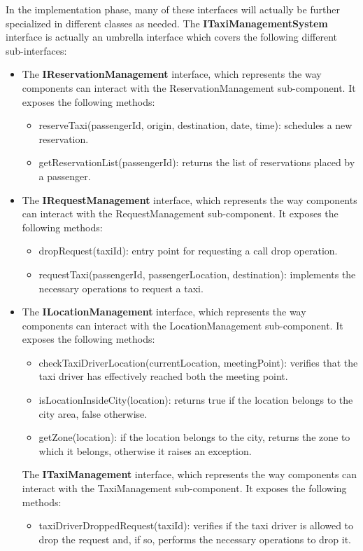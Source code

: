 In the implementation phase, many of these interfaces will actually be further specialized in different classes as needed.
The \textbf{ITaxiManagementSystem} interface is actually an umbrella interface which covers the following different sub-interfaces: 
	\begin{itemize}
	\item The \textbf{IReservationManagement} interface, which represents the way components can interact with the ReservationManagement sub-component. It exposes the following methods:
	\begin{itemize}
	\item reserveTaxi(passengerId, origin, destination, date, time): schedules a new reservation.
	\item getReservationList(passengerId): returns the list of reservations placed by a passenger.
	\end{itemize}
	\item The \textbf{IRequestManagement} interface, which represents the way components can interact with the RequestManagement sub-component. It exposes the following methods:
	\begin{itemize}
	\item dropRequest(taxiId): entry point for requesting a call drop operation.
	\item requestTaxi(passengerId, passengerLocation, destination): implements the necessary operations to request a taxi.
	\end{itemize}
	\item The \textbf{ILocationManagement} interface, which represents the way components can interact with the LocationManagement sub-component. It exposes the following methods:
	\begin{itemize}
	\item checkTaxiDriverLocation(currentLocation, meetingPoint): verifies that the taxi driver has effectively reached both the meeting point.
	\item isLocationInsideCity(location): returns true if the location belongs to the city area, false otherwise.
	\item getZone(location): if the location belongs to the city, returns the zone to which it belongs, otherwise it raises an exception.
	\end{itemize}
	The \textbf{ITaxiManagement} interface, which represents the way components can interact with the TaxiManagement sub-component. It exposes the following methods:
	\begin{itemize}
	\item taxiDriverDroppedRequest(taxiId): verifies if the taxi driver is allowed to drop the request and, if so, performs the necessary operations to drop it.

\end{itemize}
\end{itemize}
